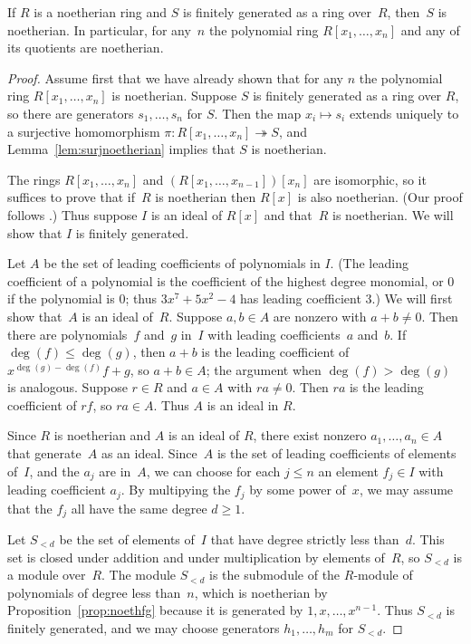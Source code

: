 \begin{theorem}
  \label{thm:hilbert}
  If $R$ is a noetherian ring and $S$ is finitely generated as a ring
  over~$R$, then~$S$ is noetherian.  In particular, for any~$n$ the
  polynomial ring $R[x_1,\dots, x_n]$ and any of its quotients are
  noetherian.
\end{theorem}
\begin{proof}
Assume first that we have already shown that for any $n$ the
polynomial ring $R[x_1,\dots, x_n]$ is noetherian.  Suppose $S$ is
finitely generated as a ring over $R$, so there are generators
$s_1,\dots, s_n$ for $S$.  Then the map $x_i\mapsto s_i$ extends
uniquely to a surjective homomorphism $\pi: R[x_1,\dots, x_n] \twoheadrightarrow S$,
and Lemma~\ref{lem:surjnoetherian} implies that $S$ is noetherian.

The rings $R[x_1,\dots, x_n]$ and $(R[x_1,\dots,x_{n-1}])[x_n]$ are
isomorphic, so it suffices to prove that if~$R$ is noetherian then
$R[x]$ is also noetherian.  (Our proof follows
\cite[\S12.5]{artin:algebra}.)
Thus suppose $I$ is an ideal of $R[x]$ and that~$R$ is
noetherian.  We will show that $I$ is finitely generated.

Let $A$ be the set of leading coefficients of polynomials in $I$.
(The leading coefficient of a polynomial is the coefficient of
the highest degree monomial, or $0$ if the polynomial is $0$; thus
$3x^7 + 5x^2  - 4$ has leading coefficient $3$.)
We will first show that~$A$ is an ideal of~$R$.
Suppose $a,b\in A$ are nonzero with $a+b\neq 0$.  Then there are
polynomials~$f$ and~$g$ in~$I$ with leading coefficients~$a$ and~$b$.
If $\deg(f)\leq \deg(g)$, then $a+b$ is the leading coefficient of
$x^{\deg(g)-\deg(f)}f + g$, so $a+b\in A$; the argument when
$\deg(f)> \deg(g)$ is analogous.  Suppose $r\in R$ and $a\in A$
with $ra\neq 0$. Then $ra$ is the leading coefficient of $rf$, so
$ra\in A$.  Thus $A$ is an ideal in $R$.

Since $R$ is noetherian and $A$ is an ideal of $R$, there exist nonzero
$a_1,\dots, a_n\in A$ that generate~$A$ as an ideal.  Since~$A$ is the set
of leading coefficients of elements of~$I$, and the $a_j$ are in~$A$,
we can choose for each $j\leq n$ an element $f_j\in I$ with leading
coefficient $a_j$.  By multipying the $f_j$ by some power of~$x$, we
may assume that the $f_j$ all have the same degree $d\geq 1$.

Let $S_{<d}$ be the set of elements of~$I$ that have degree strictly
less than~$d$.  This set is closed under addition and under
multiplication by elements of~$R$, so $S_{<d}$ is a module over~$R$.
The module $S_{<d}$ is the submodule of the $R$-module of polynomials
of degree less than~$n$, which is noetherian by
Proposition~\ref{prop:noethfg} because it is generated by $1,x,\dots,
x^{n-1}$.  Thus $S_{<d}$ is finitely generated, and we may choose
generators $h_1,\dots, h_m$ for $S_{<d}$.


\end{proof}
